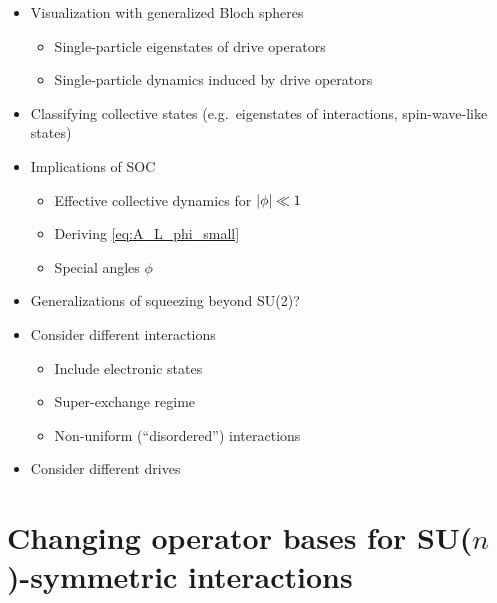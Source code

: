 \documentclass[nofootinbib,notitlepage,11pt]{revtex4-2}
\newcommand{\1}{\mathds{1}}
\begin{document}
\begin{itemize}
\item Visualization with generalized Bloch spheres
  \begin{itemize}
  \item Single-particle eigenstates of drive operators
  \item Single-particle dynamics induced by drive operators
  \end{itemize}
\item Classifying collective states (e.g.~eigenstates of interactions,
  spin-wave-like states)
\item Implications of SOC
  \begin{itemize}
  \item Effective collective dynamics for $\abs{\phi}\ll1$
  \item Deriving \eqref{eq:A_L_phi_small}
  \item Special angles $\phi$
  \end{itemize}
\item Generalizations of squeezing beyond SU(2)?
\item Consider different interactions
  \begin{itemize}
  \item Include electronic states
  \item Super-exchange regime
  \item Non-uniform (``disordered'') interactions
  \end{itemize}
\item Consider different drives
\end{itemize}

\appendix

\section{Changing operator bases for SU($n$)-symmetric interactions}
\label{sec:changing_bases}
\end{document}
